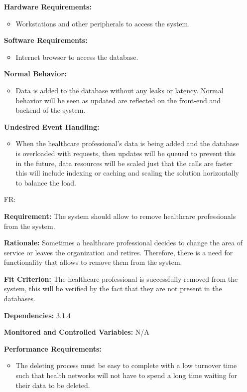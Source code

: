 \documentclass[12pt]{article}
\newcounter{reqnum} %
\begin{document}
\begin{itemize}
\textbf{Hardware Requirements:} 
\begin{itemize}
  \item Workstations and other peripherals to access the system.
\end{itemize}

\textbf{Software Requirements:} 
\begin{itemize}
  \item Internet browser to access the database.
\end{itemize}

\textbf{Normal Behavior:}
\begin{itemize}
  \item Data is added to the database without any leaks or latency. Normal behavior will be seen as updated are reflected on the front-end and backend of the system.
\end{itemize} 

\textbf{Undesired Event Handling:}
\begin{itemize}
  \item When the healthcare professional’s data is being added and the database is overloaded with requests, then updates will be queued to prevent this in the future, data resources will be scaled just that the calls are faster this will include indexing or caching and scaling the solution horizontally to balance the load.
\end{itemize} 

\item[FR\refstepcounter{reqnum}\thereqnum \label{FR_RemoveHealthProfessionals}:] 

\textbf{Requirement:} The system should allow to remove healthcare professionals from the system. 

\textbf{Rationale:} Sometimes a healthcare professional decides to change the area of service or leaves the organization and retires. Therefore, there is a need for functionality that allows to remove them from the system.

\textbf{Fit Criterion:} The healthcare professional is successfully removed from the system, this will be verified by the fact that they are not present in the databases. 

\textbf{Dependencies:} 3.1.4 

\textbf{Monitored and Controlled Variables:} N/A

\textbf{Performance Requirements:}
\begin{itemize}
  \item The deleting process must be easy to complete with a low turnover time such that health networks will not have to spend a long time waiting for their data to be deleted.
\end{itemize} 


\end{itemize}
\end{document}
